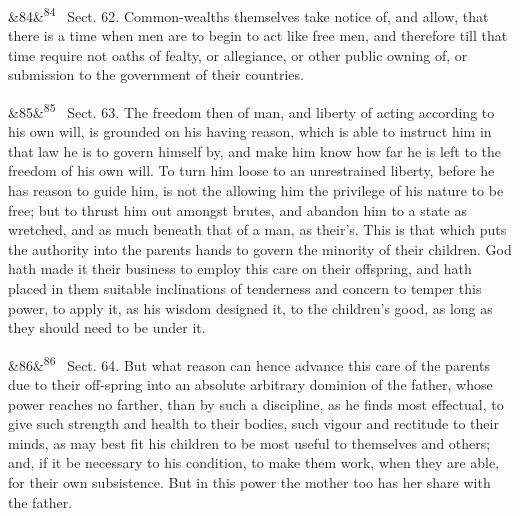 \documentclass[12pt]{article}
\newcommand{\para}[1][]{\par\noindent\ifx&#1&\else\textsuperscript{\footnotesize #1}~\fi}
\begin{document}
\para[84] Sect. 62. Common-wealths themselves take notice of, and allow, that there is a time when men are to begin to act like free men, and therefore till that time require not oaths of fealty, or allegiance, or other public owning of, or submission to the government of their countries.

\para[85] Sect. 63. The freedom then of man, and liberty of acting according to his own will, is grounded on his having reason, which is able to instruct him in that law he is to govern himself by, and make him know how far he is left to the freedom of his own will. To turn him loose to an unrestrained liberty, before he has reason to guide him, is not the allowing him the privilege of his nature to be free; but to thrust him out amongst brutes, and abandon him to a state as wretched, and as much beneath that of a man, as their's. This is that which puts the authority into the parents hands to govern the minority of their children. God hath made it their business to employ this care on their offspring, and hath placed in them suitable inclinations of tenderness and concern to temper this power, to apply it, as his wisdom designed it, to the children's good, as long as they should need to be under it.

\para[86] Sect. 64. But what reason can hence advance this care of the parents due to their off-spring into an absolute arbitrary dominion of the father, whose power reaches no farther, than by such a discipline, as he finds most effectual, to give such strength and health to their bodies, such vigour and rectitude to their minds, as may best fit his children to be most useful to themselves and others; and, if it be necessary to his condition, to make them work, when they are able, for their own subsistence. But in this power the mother too has her share with the father.
\end{document}
